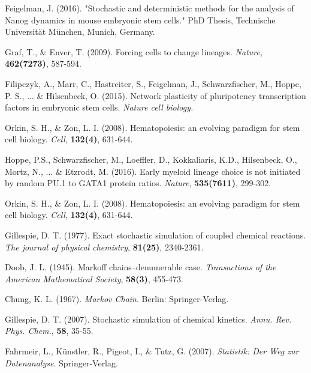 \documentclass{bioinfo}
\begin{document}
\begin{thebibliography}{}

Feigelman, J. (2016). "Stochastic and deterministic methods for the analysis of Nanog dynamics in mouse embryonic stem cells." PhD Thesis, Technische Universit\"at M\"unchen, Munich, Germany.\vspace*{-2pt}

Graf, T., \& Enver, T. (2009). Forcing cells to change lineages. \textit{Nature}, \textbf{462(7273)}, 587-594.

Filipczyk, A., Marr, C., Hastreiter, S., Feigelman, J., Schwarzfischer, M., Hoppe, P. S., ... \& Hilsenbeck, O. (2015). Network plasticity of pluripotency transcription factors in embryonic stem cells. \textit{Nature cell biology.}

Orkin, S. H., \& Zon, L. I. (2008). Hematopoiesis: an evolving paradigm for stem cell biology. \textit{Cell}, \textbf{132(4)}, 631-644.

Hoppe, P.S., Schwarzfischer, M., Loeffler, D.,  Kokkaliaris, K.D., Hilsenbeck, O., Mortz, N., ... \& Etzrodt, M. (2016). Early myeloid lineage choice is not initiated by random PU.1 to GATA1 protein ratios. \textit{Nature}, \textbf{535(7611)}, 299-302.

Orkin, S. H., \& Zon, L. I. (2008). Hematopoiesis: an evolving paradigm for stem cell biology. \textit{Cell}, \textbf{132(4)}, 631-644.

Gillespie, D. T. (1977). Exact stochastic simulation of coupled chemical reactions. \textit{The journal of physical chemistry}, \textbf{81(25)}, 2340-2361.

Doob, J. L. (1945). Markoff chains--denumerable case. \textit{Transactions of the American Mathematical Society}, \textbf{58(3)}, 455-473.

Chung, K. L. (1967). \textit{Markov Chain}. Berlin: Springer-Verlag.

Gillespie, D. T. (2007). Stochastic simulation of chemical kinetics. \textit{Annu. Rev. Phys. Chem.}, \textbf{58}, 35-55.

Fahrmeir, L., K\"unstler, R., Pigeot, I., \& Tutz, G. (2007). \textit{Statistik: Der Weg zur Datenanalyse}. Springer-Verlag.


\end{thebibliography}
\end{document}
